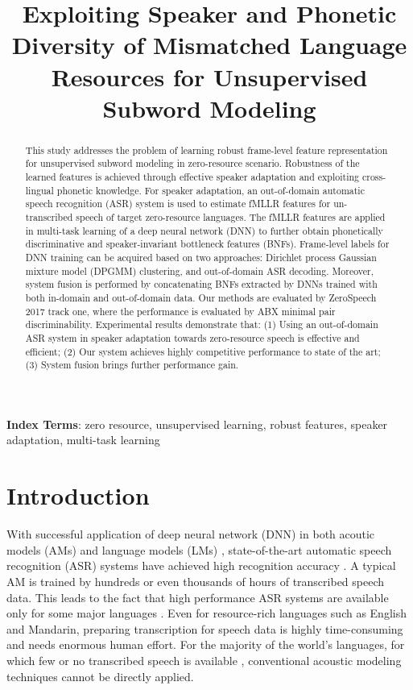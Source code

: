 \documentclass[a4paper]{article}
\title{Exploiting Speaker and Phonetic Diversity of Mismatched Language Resources for Unsupervised Subword Modeling}
\begin{document}
\maketitle
% 
\begin{abstract}
This study addresses the problem of learning robust frame-level feature representation for unsupervised subword modeling in zero-resource scenario. Robustness of the learned features is achieved through effective speaker adaptation and exploiting cross-lingual phonetic knowledge. For speaker adaptation, an out-of-domain automatic speech recognition (ASR) system is used to estimate fMLLR features for un-transcribed speech of target zero-resource languages. The fMLLR features  are applied in multi-task learning of a deep neural network (DNN) to further obtain phonetically discriminative and speaker-invariant bottleneck features (BNFs). Frame-level labels for DNN training can be acquired based on two approaches:  Dirichlet process Gaussian mixture model (DPGMM) clustering, and out-of-domain ASR decoding. Moreover, system fusion is performed by concatenating BNFs extracted by DNNs trained with both in-domain and out-of-domain data. Our methods are evaluated by ZeroSpeech 2017 track one, where the performance is evaluated by ABX minimal pair discriminability. Experimental results demonstrate that: (1) Using an out-of-domain ASR system in speaker adaptation towards zero-resource speech is effective and efficient; (2) Our system achieves highly competitive performance to state of the art; (3) System fusion brings further performance gain.
\end{abstract}
\noindent\textbf{Index Terms}: zero resource, unsupervised learning, robust features, speaker adaptation, multi-task learning

\section{Introduction}
\label{sec:intro}
With successful application of deep neural network (DNN) in both  acoutic models (AMs) \cite{hinton2012deep} and language models (LMs) \cite{ragni2016multi}, state-of-the-art automatic speech recognition (ASR) systems have achieved high recognition accuracy \cite{Saon2017,Hori2017}. 
A typical AM is trained by hundreds or even thousands of hours of transcribed speech data. This leads to the fact that high performance ASR systems are available only for some major languages \cite{shibata2017composite}. 
Even for resource-rich languages such as English and Mandarin, preparing transcription for speech data is highly time-consuming and needs enormous human effort. 
For the majority of the world's languages, for which few or no transcribed speech is available \cite{dunbar2017zero}, conventional acoustic modeling techniques cannot be directly applied.
\end{document}
